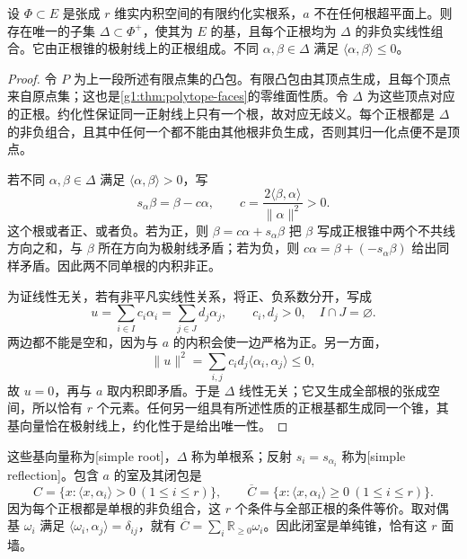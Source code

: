 \begin{theorem}\label{g1:thm:reflection-simple-system}
	设 \(\Phi\subset E\) 是张成 \(r\) 维实内积空间的有限约化实根系，\(a\) 不在任何根超平面上。则存在唯一的子集 \(\Delta\subset\Phi^+\)，使其为 \(E\) 的基，且每个正根均为 \(\Delta\) 的非负实线性组合。它由正根锥的极射线上的正根组成。不同 \(\alpha,\beta\in\Delta\) 满足 \(\langle\alpha,\beta\rangle\le0\)。
\end{theorem}
\begin{proof}
	令 \(P\) 为上一段所述有限点集的凸包。有限凸包由其顶点生成，且每个顶点来自原点集；这也是\cref{g1:thm:polytope-faces}的零维面性质。令 \(\Delta\) 为这些顶点对应的正根。约化性保证同一正射线上只有一个根，故对应无歧义。每个正根都是 \(\Delta\) 的非负组合，且其中任何一个都不能由其他根非负生成，否则其归一化点便不是顶点。

	若不同 \(\alpha,\beta\in\Delta\) 满足 \(\langle\alpha,\beta\rangle>0\)，写
	\[
		s_\alpha\beta=\beta-c\alpha,\qquad
		c=\frac{2\langle\beta,\alpha\rangle}{\lVert\alpha\rVert^2}>0.
	\]
	这个根或者正、或者负。若为正，则 \(\beta=c\alpha+s_\alpha\beta\) 把 \(\beta\) 写成正根锥中两个不共线方向之和，与 \(\beta\) 所在方向为极射线矛盾；若为负，则 \(c\alpha=\beta+(-s_\alpha\beta)\) 给出同样矛盾。因此两不同单根的内积非正。

	为证线性无关，若有非平凡实线性关系，将正、负系数分开，写成
	\[
		u=\sum_{i\in I}c_i\alpha_i
		=\sum_{j\in J}d_j\alpha_j,
		\qquad c_i,d_j>0,\quad I\cap J=\varnothing.
	\]
	两边都不能是空和，因为与 \(a\) 的内积会使一边严格为正。另一方面，
	\[
		\lVert u\rVert^2=\sum_{i,j}c_id_j\langle\alpha_i,\alpha_j\rangle\le0,
	\]
	故 \(u=0\)，再与 \(a\) 取内积即矛盾。于是 \(\Delta\) 线性无关；它又生成全部根的张成空间，所以恰有 \(r\) 个元素。任何另一组具有所述性质的正根基都生成同一个锥，其基向量恰在极射线上，约化性于是给出唯一性。
\end{proof}

这些基向量称为[simple root]，\(\Delta\) 称为单根系；反射 \(s_i=s_{\alpha_i}\) 称为[simple reflection]。包含 \(a\) 的室及其闭包是
\begin{equation}\label{g1:eq:simple-root-chamber}
	C=\{x:\langle x,\alpha_i\rangle>0\ (1\le i\le r)\},\qquad
	\overline C=\{x:\langle x,\alpha_i\rangle\ge0\ (1\le i\le r)\}.
\end{equation}
因为每个正根都是单根的非负组合，这 \(r\) 个条件与全部正根的条件等价。取对偶基 \(\omega_i\) 满足 \(\langle\omega_i,\alpha_j\rangle=\delta_{ij}\)，就有 \(\overline C=\sum_i\mathbb R_{\ge0}\omega_i\)。因此闭室是单纯锥，恰有这 \(r\) 面墙。

